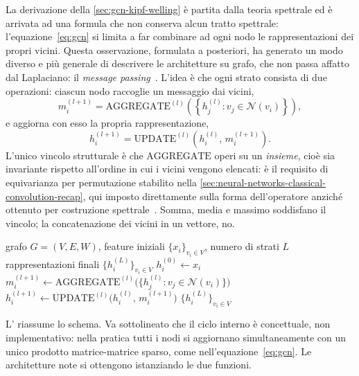 La derivazione della \cref{sec:gcn-kipf-welling} è partita dalla teoria spettrale ed è arrivata ad una formula che non conserva alcun tratto spettrale: l'equazione~\eqref{eq:gcn} si limita a far combinare ad ogni nodo le rappresentazioni dei propri vicini. Questa osservazione, formulata a posteriori, ha generato un modo diverso e più generale di descrivere le architetture su grafo, che non passa affatto dal Laplaciano: il \emph{message passing}~\cite{hamilton2020graph}. L'idea è che ogni strato consista di due operazioni: ciascun nodo raccoglie un messaggio dai vicini,
\begin{equation}
\label{eq:message-passing-agg}
m_i^{(l+1)} = \mathrm{AGGREGATE}^{(l)}\!\left(\left\{h_j^{(l)} : v_j\in\mathcal N(v_i)\right\}\right),
\end{equation}
e aggiorna con esso la propria rappresentazione,
\begin{equation}
\label{eq:message-passing-upd}
h_i^{(l+1)} = \mathrm{UPDATE}^{(l)}\!\left(h_i^{(l)},\, m_i^{(l+1)}\right).
\end{equation}
L'unico vincolo strutturale è che $\mathrm{AGGREGATE}$ operi su un \emph{insieme}, cioè sia invariante rispetto all'ordine in cui i vicini vengono elencati: è il requisito di equivarianza per permutazione stabilito nella \cref{sec:neural-networks-classical-convolution-recap}, qui imposto direttamente sulla forma dell'operatore anziché ottenuto per costruzione spettrale~\cite{bronstein2021geometric}. Somma, media e massimo soddisfano il vincolo; la concatenazione dei vicini in un vettore, no.

\begin{algorithm}[H]
\caption{Message passing su $L$ strati}
\label{alg:message-passing}
\begin{algorithmic}[1]
\Require grafo $G=(V,E,W)$, feature iniziali $\{x_i\}_{v_i\in V}$, numero di strati $L$
\Ensure rappresentazioni finali $\{h_i^{(L)}\}_{v_i\in V}$
    \State $h_i^{(0)} \gets x_i$
\EndFor
{}
        \State $m_i^{(l+1)} \gets \mathrm{AGGREGATE}^{(l)}\big(\{h_j^{(l)} : v_j\in\mathcal N(v_i)\}\big)$
        \State $h_i^{(l+1)} \gets \mathrm{UPDATE}^{(l)}\big(h_i^{(l)},\, m_i^{(l+1)}\big)$
    \EndFor
\EndFor
\State \Return $\{h_i^{(L)}\}_{v_i\in V}$
\end{algorithmic}
\end{algorithm}

L' riassume lo schema. Va sottolineato che il ciclo interno è concettuale, non implementativo: nella pratica tutti i nodi si aggiornano simultaneamente con un unico prodotto matrice-matrice sparso, come nell'equazione~\eqref{eq:gcn}. Le architetture note si ottengono istanziando le due funzioni.


